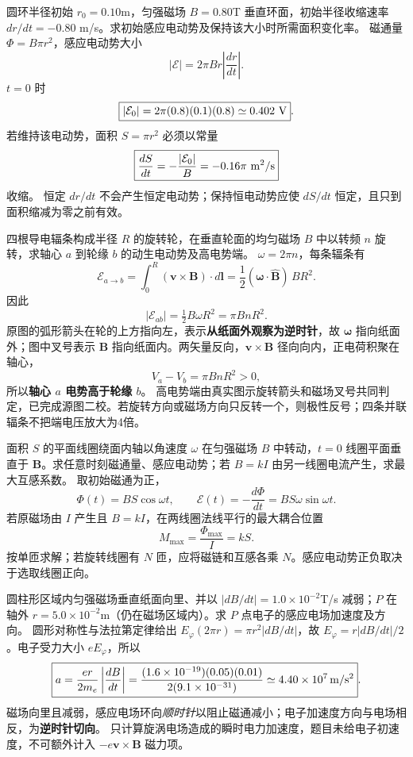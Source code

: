 \problemtext 圆环半径初始 $r_0=0.10$m，匀强磁场 $B=0.80$T 垂直环面，初始半径收缩速率 $dr/dt=-0.80$ m/s。求初始感应电动势及保持该大小时所需面积变化率。
\workings 磁通量 $\Phi=B\pi r^2$，感应电动势大小
\[|\mathcal E|=2\pi Br\left|\frac{dr}{dt}\right|.\]
$t=0$ 时
\[\boxed{|\mathcal E_0|=2\pi(0.8)(0.1)(0.8)\simeq0.402\ {\rm V}}.\]
若维持该电动势，面积 $S=\pi r^2$ 必须以常量
\[\boxed{\frac{dS}{dt}=-\frac{|\mathcal E_0|}{B}=-0.16\pi\ {\rm m^2/s}}\]
收缩。
\crosscheck 恒定 $dr/dt$ 不会产生恒定电动势；保持恒电动势应使 $dS/dt$ 恒定，且只到面积缩减为零之前有效。

\problemtext 四根导电辐条构成半径 $R$ 的旋转轮，在垂直轮面的均匀磁场 $B$ 中以转频 $n$ 旋转，求轴心 $a$ 到轮缘 $b$ 的动生电动势及高电势端。
\workings $\omega=2\pi n$，每条辐条有
\[\mathcal E_{a\to b}=\int_0^R(\bm v\times\bm B)\cdot d\bm l
=\frac12(\bm\omega\cdot\hat{\bm B})\,BR^2.\]
因此
\[\boxed{|\mathcal E_{ab}|=\tfrac12 B\omega R^2=\pi BnR^2}.\]
原图的弧形箭头在轮的上方指向左，表示\textbf{从纸面外观察为逆时针}，故 $\bm\omega$ 指向纸面外；图中叉号表示 $\bm B$ 指向纸面内。两矢量反向，$\bm v\times\bm B$ 径向向内，正电荷积聚在轴心，
\[
\boxed{V_a-V_b=\pi BnR^2>0},
\]
所以\textbf{轴心 $a$ 电势高于轮缘 $b$}。
\crosscheck 高电势端由真实图示旋转箭头和磁场叉号共同判定，已完成源图二校。若旋转方向或磁场方向只反转一个，则极性反号；四条并联辐条不把端电压放大为4倍。

\problemtext 面积 $S$ 的平面线圈绕面内轴以角速度 $\omega$ 在匀强磁场 $B$ 中转动，$t=0$ 线圈平面垂直于 $\bm B$。求任意时刻磁通量、感应电动势；若 $B=kI$ 由另一线圈电流产生，求最大互感系数。
\workings 取初始磁通为正，
\[\boxed{\Phi(t)=BS\cos\omega t},\qquad
\boxed{\mathcal E(t)=-\frac{d\Phi}{dt}=BS\omega\sin\omega t}.\]
若原磁场由 $I$ 产生且 $B=kI$，在两线圈法线平行的最大耦合位置
\[\boxed{M_{\max}=\frac{\Phi_{\max}}I=kS}.\]
\crosscheck 按单匝求解；若旋转线圈有 $N$ 匝，应将磁链和互感各乘 $N$。感应电动势正负取决于选取线圈正向。

\problemtext 圆柱形区域内匀强磁场垂直纸面向里、并以 $|dB/dt|=1.0\times10^{-2}$T/s 减弱；$P$ 在轴外 $r=5.0\times10^{-2}$m（仍在磁场区域内）。求 $P$ 点电子的感应电场加速度及方向。
\workings 圆形对称性与法拉第定律给出 $E_\varphi(2\pi r)=\pi r^2|dB/dt|$，故 $E_\varphi=r|dB/dt|/2$。电子受力大小 $eE_\varphi$，所以
\[
\boxed{a=\frac{er}{2m_e}\left|\frac{dB}{dt}\right|
=\frac{(1.6\times10^{-19})(0.05)(0.01)}{2(9.1\times10^{-31})}
\simeq4.40\times10^7\,{\rm m/s^2}}.
\]
磁场向里且减弱，感应电场环向\emph{顺时针}以阻止磁通减小；电子加速度方向与电场相反，为\textbf{逆时针切向}。
\crosscheck 只计算旋涡电场造成的瞬时电力加速度，题目未给电子初速度，不可额外计入 $-e\bm v\times\bm B$ 磁力项。
